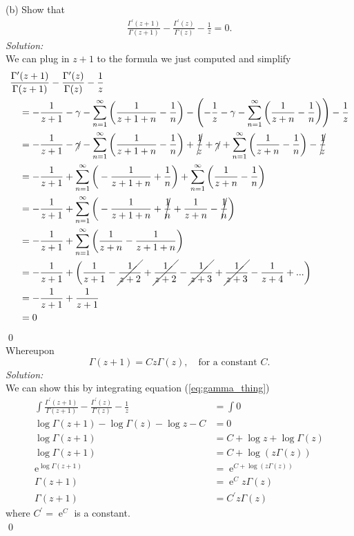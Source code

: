 \documentclass[10pt]{amsart}
\DeclareMathOperator{\E}{e}
\theoremstyle{nonumberplain}
\begin{document}
\begin{enumerate}[label={\bf {\arabic*}:}]
\noindent
(b) Show that
\begin{align}
\frac {\Gamma^\prime(z + 1)} {\Gamma(z + 1)} - \frac {\Gamma^\prime(z)} {\Gamma(z)} - \frac 1 z = 0.
\label{eq:gamma_thing}
\end{align}
\textit{Solution:} \\
We can plug in $z + 1$ to the formula we just computed and simplify
\begin{align*}
&\frac {\Gamma^\prime(z + 1)} {\Gamma(z + 1)} - \frac {\Gamma^\prime(z)} {\Gamma(z)} - \frac 1 z \\
	& \quad = - \frac 1 {z + 1} - \gamma - \sum_{n=1}^\infty \bigg( \frac 1 {z + 1 + n} - \frac 1 n \bigg) - \left(- \frac 1 z - \gamma - \sum_{n=1}^\infty \bigg( \frac 1 {z + n} - \frac 1 n \bigg) \right) - \frac 1 z \\
	& \quad = - \frac 1 {z + 1} - \cancel{\gamma} - \sum_{n=1}^\infty \bigg( \frac 1 {z + 1 + n} - \frac 1 n \bigg) + \cancel{\frac 1 z} + \cancel{\gamma} + \sum_{n=1}^\infty \bigg( \frac 1 {z + n} - \frac 1 n \bigg) - \cancel{\frac 1 z} \\
	& \quad = - \frac 1 {z + 1} + \sum_{n=1}^\infty \bigg( - \frac 1 {z + 1 + n} + \frac 1 n \bigg) + \sum_{n=1}^\infty \bigg( \frac 1 {z + n} - \frac 1 n \bigg) \\
	& \quad = - \frac 1 {z + 1} + \sum_{n=1}^\infty \bigg( - \frac 1 {z + 1 + n} + \cancel{\frac 1 n} + \frac 1 {z + n} - \cancel{\frac 1 n} \bigg) \\
	& \quad = - \frac 1 {z + 1} + \sum_{n=1}^\infty \bigg(\frac 1 {z + n}  - \frac 1 {z + 1 + n} \bigg) \\
	& \quad = - \frac 1 {z + 1} + \bigg(\frac 1 {z + 1}  - \cancel{\frac 1 {z + 2}} + \cancel{\frac 1 {z + 2}}  - \cancel{\frac 1 {z + 3}} + \cancel{\frac 1 {z + 3}}  - \frac 1 {z + 4} + ... \bigg) \\
	& \quad = - \frac 1 {z + 1} + \frac 1 {z + 1} \\
	& \quad = 0
\end{align*}
\qed \\
Whereupon
$$ \Gamma(z + 1) = Cz\Gamma(z), \quad \text{for a constant $C$}. $$
\textit{Solution:} \\
We can show this by integrating equation (\ref{eq:gamma_thing})
\begin{align*}
\int \frac {\Gamma^\prime(z + 1)} {\Gamma(z + 1)} - \frac {\Gamma^\prime(z)} {\Gamma(z)} - \frac 1 z &= \int 0 \\
\log \Gamma(z + 1) - \log {\Gamma(z)} - \log z - C &= 0 \\
\log \Gamma(z + 1) &= C + \log z + \log {\Gamma(z)} \\
\log \Gamma(z + 1) &= C + \log (z{\Gamma(z)}) \\
\E^{\log \Gamma(z + 1)} &= \E^{C + \log (z{\Gamma(z)})} \\
\Gamma(z + 1) &= \E^C z\Gamma(z) \\
\Gamma(z + 1) &= C^\prime z\Gamma(z)
\end{align*}
where $C^\prime = \E^C$ is a constant. \\
\qed \\
\newpage


\end{enumerate}
\end{document}
